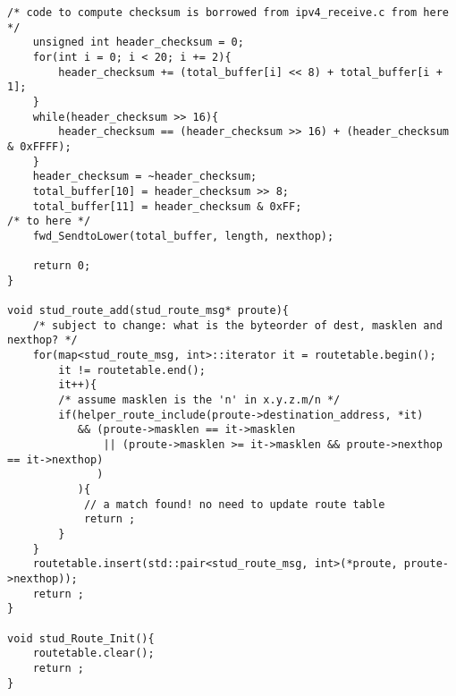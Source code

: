 \documentclass{article}
\begin{document}
\begin{lstlisting}
/* code to compute checksum is borrowed from ipv4_receive.c from here */
    unsigned int header_checksum = 0;
    for(int i = 0; i < 20; i += 2){
        header_checksum += (total_buffer[i] << 8) + total_buffer[i + 1];
    }
    while(header_checksum >> 16){
        header_checksum == (header_checksum >> 16) + (header_checksum & 0xFFFF);
    }
    header_checksum = ~header_checksum;
    total_buffer[10] = header_checksum >> 8;
    total_buffer[11] = header_checksum & 0xFF;
/* to here */
    fwd_SendtoLower(total_buffer, length, nexthop);

    return 0;
}

void stud_route_add(stud_route_msg* proute){
    /* subject to change: what is the byteorder of dest, masklen and nexthop? */
    for(map<stud_route_msg, int>::iterator it = routetable.begin();
        it != routetable.end();
        it++){
        /* assume masklen is the 'n' in x.y.z.m/n */
        if(helper_route_include(proute->destination_address, *it)
           && (proute->masklen == it->masklen
               || (proute->masklen >= it->masklen && proute->nexthop == it->nexthop)
              )
           ){
            // a match found! no need to update route table
            return ;
        }
    }
    routetable.insert(std::pair<stud_route_msg, int>(*proute, proute->nexthop));
    return ;
}

void stud_Route_Init(){
    routetable.clear();
    return ;
}

\end{lstlisting}
\end{document}
